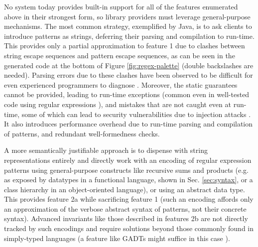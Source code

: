 No system today provides built-in support for all of the features enumerated above in their strongest form, so library providers must leverage  general-purpose mechanisms. %
The most common strategy, exemplified by Java, is to ask clients to introduce patterns as strings, deferring their  parsing and compilation to run-time. This provides only a partial approximation to feature 1 due to clashes between string escape sequences and pattern escape sequences, as can be seen in the generated code at the bottom of Figure \ref{fig:regex-palette} (double backslashes are needed). Parsing errors due to these clashes have been observed to be difficult for even experienced programmers to diagnose \cite{Omar:2012:ACC:2337223.2337324}. Moreover, the static guarantees cannot be provided, leading to run-time exceptions (common even in well-tested code using regular expressions \cite{spishak2012type}), and mistakes that are not caught even at run-time, some of which can lead to security vulnerabilities due to injection attacks \cite{owasp2013}. It also introduces performance overhead due to run-time parsing and compilation of patterns, and redundant well-formedness checks.  


A more semantically justifiable approach is to dispense with string representations entirely and directly work with an encoding of regular expression patterns using  general-purpose constructs like recursive sums and  products (e.g. as exposed by  datatypes in a functional language, shown in Sec. \ref{sec:syntax}, or a class hierarchy in an object-oriented language), or using an abstract data type. This provides feature 2a while sacrificing feature 1 (such an encoding affords only an approximation of the verbose abstract syntax of patterns, not their concrete syntax). Advanced invariants like those described in features 2b are not directly tracked by such encodings and require solutions beyond those commonly found in simply-typed languages (a feature like GADTs might suffice in this case \cite{XiCheChe03}).%

